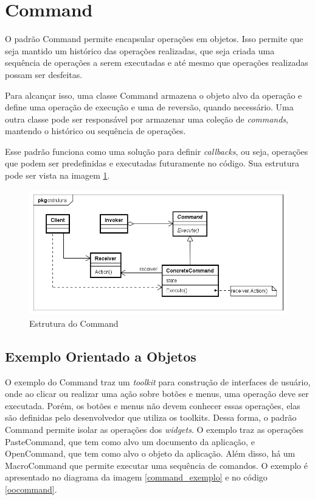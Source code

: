\section{Command}

O padrão Command permite encapsular operações 
em objetos. Isso permite que seja mantido um 
histórico das operações realizadas, que seja 
criada uma sequência de operações a serem 
executadas e até mesmo que operações realizadas 
possam ser desfeitas.

Para alcançar isso, uma classe Command armazena o 
objeto alvo da operação e define uma operação 
de execução e uma de reversão, quando necessário. 
Uma outra classe pode ser responsável por armazenar 
uma coleção de \textit{commands}, mantendo o 
histórico ou sequência de operações. 

Esse padrão funciona como uma solução para definir 
\textit{callbacks}, ou seja, operações que podem ser 
predefinidas e executadas futuramente no código. Sua 
estrutura pode ser vista na imagem \ref{command_struct}.

\begin{figure}[htb]
	\caption{\label{command_struct}Estrutura do Command}
	\begin{center}
	    \includegraphics[scale=0.5]{5_padroes-contexto-funcional/5.3_comportamentais/5.3.02_command/command_struct.png}
	\end{center}
\end{figure}

\subsection*{Exemplo Orientado a Objetos}

O exemplo do Command traz um \textit{toolkit} para 
construção de interfaces de usuário, onde ao clicar 
ou realizar uma ação sobre botões e menus, uma 
operação deve ser executada. Porém, os botões e 
menus não devem conhecer essas operações, elas são 
definidas pelo desenvolvedor que utiliza os toolkits. 
Dessa forma, o padrão Command permite isolar as 
operações dos \textit{widgets}. O exemplo traz as 
operações PasteCommand, que tem como alvo um 
documento da aplicação, e OpenCommand, que tem como 
alvo o objeto da aplicação. Além disso, há um 
MacroCommand que permite executar uma sequência 
de comandos. O exemplo é apresentado no diagrama da 
imagem \ref{command_exemplo} e no código \ref{oocommand}.


